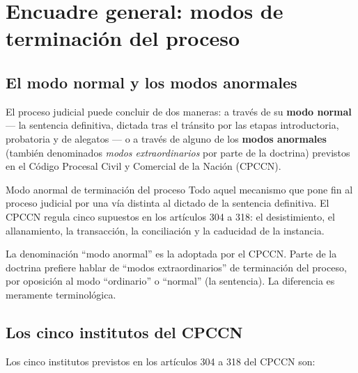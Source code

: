 \documentclass[12pt,oneside]{book}
\begin{document}
\tableofcontents
\newpage

\chapter{Encuadre general: modos de terminación del proceso}

\section{El modo normal y los modos anormales}

El proceso judicial puede concluir de dos maneras: a través de su \textbf{modo normal} --- la sentencia definitiva, dictada tras el tránsito por las etapas introductoria, probatoria y de alegatos --- o a través de alguno de los \textbf{modos anormales} (también denominados \emph{modos extraordinarios} por parte de la doctrina) previstos en el Código Procesal Civil y Comercial de la Nación (CPCCN).

\begin{definition}{Modo anormal de terminación del proceso}
Todo aquel mecanismo que pone fin al proceso judicial por una vía distinta al dictado de la sentencia definitiva. El CPCCN regula cinco supuestos en los artículos 304 a 318: el desistimiento, el allanamiento, la transacción, la conciliación y la caducidad de la instancia.
\end{definition}

\begin{note}
La denominación ``modo anormal'' es la adoptada por el CPCCN. Parte de la doctrina prefiere hablar de ``modos extraordinarios'' de terminación del proceso, por oposición al modo ``ordinario'' o ``normal'' (la sentencia). La diferencia es meramente terminológica.
\end{note}

\section{Los cinco institutos del CPCCN}

Los cinco institutos previstos en los artículos 304 a 318 del CPCCN son:
\end{document}
